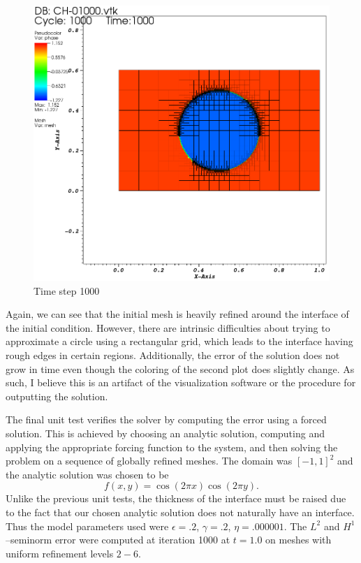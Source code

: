 \documentclass[11pt,fullpage]{article}
\newcommand{\eps}{\epsilon}
\theoremstyle{lemma}
\theoremstyle{definition}
\theoremstyle{lemma}
\begin{document}
\begin{figure}[ht!]
\begin{minipage}{.4\paperwidth}
		\includegraphics[scale=.9]{CHBall2.png}
		\\Time step 1000
	\end{minipage}
\end{figure}
Again, we can see that the initial mesh is heavily refined around the interface of the initial condition. However, there are intrinsic difficulties about trying to approximate a circle using a rectangular grid, which leads to the interface having rough edges in certain regions. Additionally, the error of the solution does not grow in time even though the coloring of the second plot does slightly change. As such, I believe this is an artifact of the visualization software or the procedure for outputting the solution.

The final unit test verifies the solver by computing the error using a forced solution. This is achieved by choosing an analytic solution, computing and applying the appropriate forcing function to the system, and then solving the problem on a sequence of globally refined meshes. The domain was $[-1,1]^2$ and the analytic solution was chosen to be
$$
	f(x,y) = \cos(2\pi x)\cos(2\pi y).
$$
Unlike the previous unit tests, the thickness of the interface must be raised due to the fact that our chosen analytic solution does not naturally have an interface. Thus the model parameters used were $\eps = .2$, $\gamma = .2$, $\eta = .000001$. The $L^2$ and $H^1$--seminorm error were computed at iteration 1000 at $t=1.0$ on meshes with uniform refinement levels $2-6$.
\end{document}
